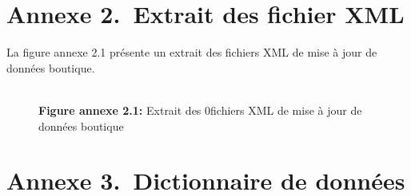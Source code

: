 \section*{Annexe 2.~Extrait des fichier XML}


La figure annexe 2.1 présente un extrait des fichiers XML de mise à jour de données boutique.
\begin{figure}[htpb]
    \centering
    {\\\textbf{Figure annexe 2.1:} Extrait des 0fichiers XML de mise à jour de données boutique}
\end{figure}\newpage
\section*{Annexe 3.~Dictionnaire de données}


